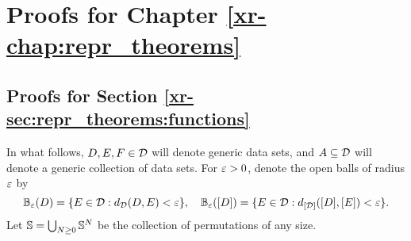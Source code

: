 \documentclass[12pt, twoside]{report}
\newcommand{\xrprefix}[1]{xr-#1}
\begin{document}
\chapter
    {Proofs for Chapter \ref{\xrprefix{chap:repr_theorems}}}
\label{app:proofs_repr_theorems}

\section{Proofs for Section \ref{\xrprefix{sec:repr_theorems:functions}}}
\label{sec:proofs_repr_theorems:functions}

In what follows, $D,E,F \in \mathcal{D}$ will denote generic data sets, and $A \subseteq \mathcal{D}$ will denote a generic collection of data sets.
For $\varepsilon > 0$, denote the open balls of radius $\varepsilon$ by
\begin{equation}
    \mathbb{B}_\varepsilon(D) = \{E \in \mathcal{D} : d_{\mathcal{D}}(D, E) < \varepsilon\},
    \quad
    \mathbb{B}_\varepsilon([D]) = \{E \in \mathcal{D} : d_{[\mathcal{D}]}([D], [E]) < \varepsilon\}.
\end{equation}
Let $\mathbb{S} = \bigcup_{N \ge 0} \mathbb{S}^N$ be the collection of permutations of any size.
\end{document}
